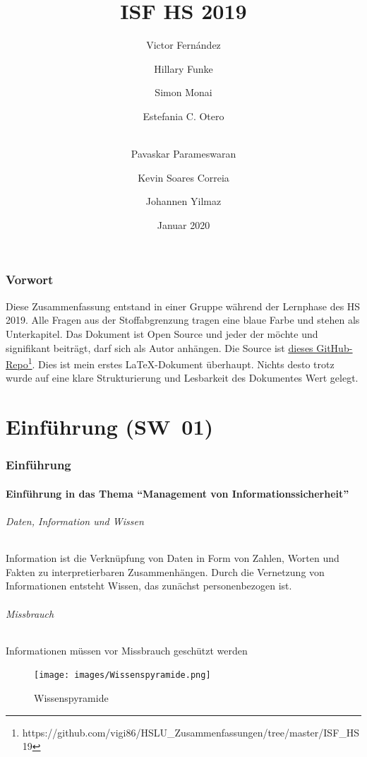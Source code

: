 \documentclass[10pt,a4paper]{article}
\title{ISF HS 2019}
\author[1]{Victor Fernández}
\author[2]{Hillary Funke}
\author[2]{Simon Monai}
\author[2]{Estefania C. Otero}
\author[3]{\\Pavaskar Parameswaran}
\author[3]{Kevin Soares Correia}
\author[2]{Johannen Yilmaz}
\affil[1]{HSLU Informatik}
\affil[2]{HSLU Information and Cyber Security}
\affil[3]{HSLU Wirtschaftsinformatik}
\date{Januar 2020}
\begin{document}
\maketitle
\thispagestyle{empty}
\section*{Vorwort}Diese Zusammenfassung entstand in einer Gruppe während der Lernphase des HS 2019. Alle Fragen aus der Stoffabgrenzung tragen eine {\color{dunkelblau}blaue Farbe} und stehen als Unterkapitel. Das Dokument ist Open Source und jeder der möchte und signifikant beiträgt, darf sich als Autor anhängen. Die Source ist \underline{\href{https://github.com/vigi86/HSLU_Zusammenfassungen/tree/master/ISF_HS19}{dieses GitHub-Repo}}\footnote{https://github.com/vigi86/HSLU\_Zusammenfassungen/tree/master/ISF\_HS19}. Dies ist mein erstes \LaTeX{}-Dokument überhaupt. Nichts desto trotz wurde auf eine klare Strukturierung und Lesbarkeit des Dokumentes Wert gelegt.
\tableofcontents
\thispagestyle{empty}
\pagebreak


\part{Einführung (SW~01)}

\section{Einführung}

\subsection*{Einführung in das Thema "`Management von Informationssicherheit"'}

\paragraph*{Daten, Information und Wissen}Information ist die Verknüpfung von Daten in Form von Zahlen, Worten und Fakten zu interpretierbaren Zusammenhängen. Durch die Vernetzung von Informationen entsteht Wissen, das zunächst personenbezogen ist.

\paragraph*{Missbrauch}Informationen müssen vor Missbrauch geschützt werden
\begin{figure}[H]
    \begin{center}
    \texttt{[image: images/Wissenspyramide.png]}
    \caption{Wissenspyramide\cite{wiki}}
    \label{Wissenspyramide}
    \end{center}
\end{figure}
\end{document}
